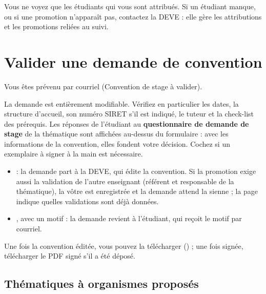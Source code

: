 \documentclass[11pt,a4paper]{article}
\begin{document}
\begin{astuce}
Vous ne voyez que les étudiants qui vous sont attribués. Si un étudiant manque, ou
si une promotion n'apparaît pas, contactez la DEVE : elle gère les attributions
et les promotions reliées au suivi.
\end{astuce}

\section{Valider une demande de convention}

Vous êtes prévenu par courriel (\og Convention de stage à valider\fg{}).


La demande est entièrement modifiable. Vérifiez en particulier les dates, la
structure d'accueil, son numéro SIRET s'il est indiqué, le tuteur et la
check-list des prérequis. Les réponses de l'étudiant au \textbf{questionnaire de
demande de stage} de la thématique sont affichées au-dessus du formulaire : avec
les informations de la convention, elles fondent votre décision. Cochez
 si un exemplaire à signer à la main est nécessaire.


\begin{itemize}
  \item {} : la demande part à la DEVE, qui édite la convention.
        Si la promotion exige aussi la validation de l'autre enseignant (référent
        et responsable de la thématique), la vôtre est enregistrée et la demande
        attend la sienne ; la page indique quelles validations sont déjà
        données.
  \item {}, avec un motif : la demande revient à l'étudiant, qui
        reçoit le motif par courriel.
\end{itemize}

Une fois la convention éditée, vous pouvez la télécharger
() ; une fois signée, télécharger le PDF signé
s'il a été déposé.

\subsection{Thématiques à organismes proposés}
\label{sec:organismes}
\end{document}
